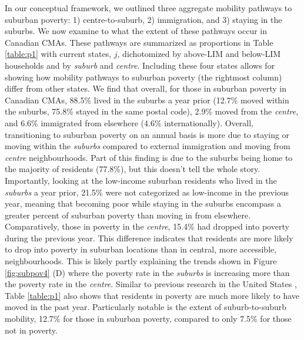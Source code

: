 In our conceptual framework, we outlined three aggregate mobility pathways to suburban poverty: 1) centre-to-suburb, 2) immigration, and 3) staying in the suburbs. We now examine to what the extent of these pathways occur in Canadian CMAs. These pathways are summarized as proportions in Table \ref{table:p1} with current states, $j$, dichotomized by above-LIM and below-LIM households and by \textit{suburb} and \textit{centre}. Including these four states allows for showing how mobility pathways to suburban poverty (the rightmost column) differ from other states. We find that overall, for those in suburban poverty in Canadian CMAs, 88.5\% lived in the suburbs a year prior (12.7\% moved within the suburbs, 75.8\% stayed in the same postal code), 2.9\% moved from the \textit{centre}, and 6.6\% immigrated from elsewhere (4.6\% internationally). Overall, transitioning to suburban poverty on an annual basis is more due to staying or moving within the \textit{suburbs} compared to external immigration and moving from \textit{centre} neighbourhoods. Part of this finding is due to the suburbs being home to the majority of residents (77.8\%), but this doesn't tell the whole story. Importantly, looking at the low-income suburban residents who lived in the \textit{suburbs} a year prior, 21.5\% were not categorized as low-income in the previous year, meaning that becoming poor while staying in the suburbs encompass a greater percent of suburban poverty than moving in from elsewhere. Comparatively, those in poverty in the \textit{centre}, 15.4\% had dropped into poverty during the previous year. This difference indicates that residents are more likely to drop into poverty in suburban locations than in central, more accessible, neighbourhoods. This is likely partly explaining the trends shown in Figure \ref{fig:subpov4} (D) where the poverty rate in the \textit{suburbs} is increasing more than the poverty rate in the \textit{centre}. Similar to previous research in the United States \cite{delmelle_new_2020}, Table \ref{table:p1} also shows that residents in poverty are much more likely to have moved in the past year. Particularly notable is the extent of suburb-to-suburb mobility, 12.7\% for those in suburban poverty, compared to only 7.5\% for those not in poverty. 

